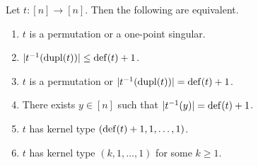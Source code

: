 \begin{proposition}\label{prop:char-one-attractor}
	Let $t \colon [n] \to [n]$. Then the following are equivalent.
	\begin{enumerate}
		\item \label{prelim:prop:charone:item:one} $t$ is a permutation or a one-point singular.
		
		\item \label{prelim:prop:charone:item:invduple0} $|t^{-1}(\dupl{t})| \le \defect{t} + 1$.
		
		\item \label{prelim:prop:charone:item:invduple} $t$ is a permutation or $|t^{-1}(\dupl{t})| = \defect{t} + 1$. 
		
		\item \label{prelim:prop:charone:item:def1y} There exists $y \in [n]$ such that $|\applyfunc{y}{t^{-1}}| = \defect{t} + 1$.
		
		\item \label{prelim:prop:charone:item:def1} $t$ has kernel type $(\defect{t}+1,1,\ldots,1)$.
		
		\item \label{prelim:prop:charone:item:k111} $t$ has kernel type $(k,1,\ldots,1)$ for some $k \ge 1$.
	\end{enumerate}
\end{proposition}
